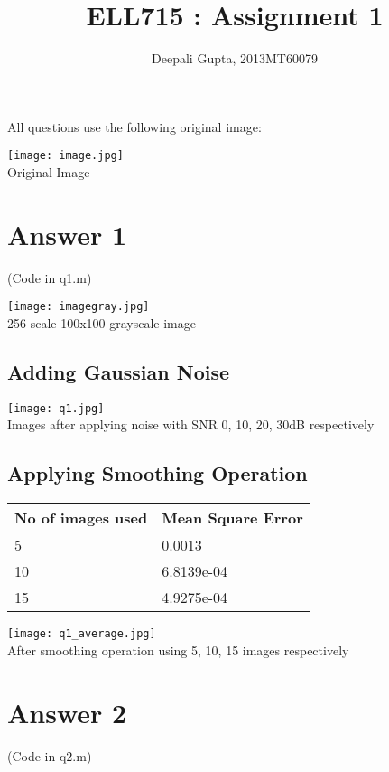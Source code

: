 \documentclass[10pt]{article}
\title{ELL715 : Assignment 1}
\author {Deepali Gupta, 2013MT60079}
\begin{document}
\maketitle
All questions use the following original image:
\begin{center}
\texttt{[image: image.jpg]}\\Original Image
\end{center}
\section{Answer 1}
(Code in q1.m)\\
\begin{center}
\texttt{[image: imagegray.jpg]}\\256 scale 100x100 grayscale image
\end{center}

\subsection{Adding Gaussian Noise}
\begin{center}
\texttt{[image: q1.jpg]}\\Images after applying noise with SNR 0, 10, 20, 30dB respectively
\end{center}

\subsection{Applying Smoothing Operation}

\begin{table}[h!]
\centering
  
   \begin{tabular}{|p{4cm}|p{3cm}|}
  \hline
  No of images used & Mean Square Error\\
  \hline
  5 & 0.0013\\
  \hline
  10 &  6.8139e-04\\
  \hline
  15 & 4.9275e-04\\
  \hline
  \end{tabular}
\end{table}

\begin{center}
\texttt{[image: q1\_average.jpg]}\\After smoothing operation using 5, 10, 15 images respectively
\end{center}

\section{Answer 2}
(Code in q2.m)\\
\end{document}

